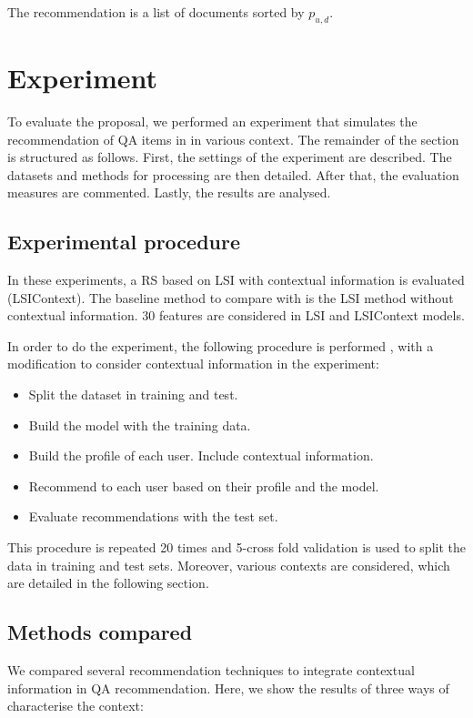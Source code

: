 \documentclass[preprint]{elsarticle}
\begin{document}
\begin{spacing}{1.5}
The recommendation is a list of documents sorted by $p_{u,d}$.

\section{Experiment}
\label{sec:case-study}

To evaluate the proposal, we performed an experiment that simulates the recommendation of QA items in in various context. The remainder of the section is structured as follows. First, the settings of the experiment are described. The datasets and methods for processing are then detailed. After that, the evaluation measures are commented. Lastly, the results are analysed.

\subsection{Experimental procedure}

In these experiments, a RS based on LSI with contextual information is evaluated (LSIContext). The baseline method to compare with is the LSI method without contextual information. 30 features are considered in LSI and LSIContext models.

In order to do the experiment, the following procedure is performed \cite{Sarwar2001}, with a modification to consider contextual information in the experiment:
\begin{itemize}
	\item Split the dataset in training and test.
	\item Build the model with the training data.
	\item Build the profile of each user. Include contextual information.
	\item Recommend to each user based on their profile and the model.
	\item Evaluate recommendations with the test set.
\end{itemize}

This procedure is repeated 20 times and 5-cross fold validation is used to split the data in training and test sets. Moreover, various contexts are considered, which are detailed in the following section.

\subsection{Methods compared}

We compared several recommendation techniques to integrate contextual information in QA recommendation. Here, we show the results of three ways of characterise the context:


\end{spacing}
\end{document}
